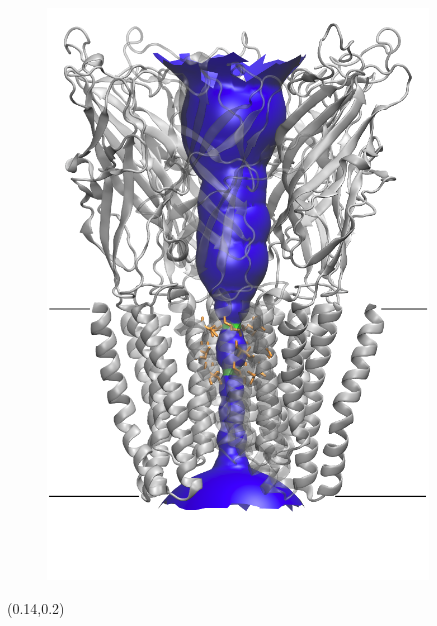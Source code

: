 \documentclass[8pt]{beamer}
\begin{document}
\begin{frame}[t]
\begin{minipage}[t]{0.4\textwidth}
{\begin{figure}
    \includegraphics[width=0.9\textwidth]{Figure/GLIC.png}    
\end{figure}}
\end{minipage}

\begin{textblock*}{10cm}(0.14\textwidth,0.2\textheight)
\end{textblock*}

\end{frame}
\end{document}
